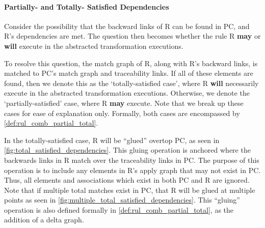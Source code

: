 \paragraph{Partially- and Totally- Satisfied Dependencies}

Consider the possibility that the backward links of R can be found in PC, and R's dependencies are met. The question then becomes whether the rule R \textbf{may} or \textbf{will} execute in the abstracted transformation executions.

To resolve this question, the match graph of R, along with R's backward links, is matched to PC's match graph and traceability links. If all of these elements are found, then we denote this as the `totally-satisfied case', where R \textbf{will} necessarily execute in the abstracted transformation executions. Otherwise, we denote the `partially-satisfied' case, where R \textbf{may} execute. Note that we break up these cases for ease of explanation only. Formally, both cases are encompassed by \cref{def:rul_comb_partial_total}.

In the totally-satisfied case, R will be ``glued'' overtop PC, as seen in \cref{fig:total_satisfied_dependencies}. This gluing operation is anchored where the backwards links in R match over the traceability links in PC. The purpose of this operation is to include any elements in R's apply graph that may not exist in PC. Thus, all elements and associations which exist in both PC and R are ignored. Note that if multiple total matches exist in PC, that R will be glued at multiple points as seen in \cref{fig:multiple_total_satisfied_dependencies}. This ``gluing'' operation is also defined formally in \cref{def:rul_comb_partial_total}, as the addition of a delta graph.


